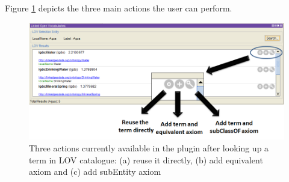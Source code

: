 Figure \ref{fig:LOVoptions} depicts the three main actions the user can perform. %

\begin{figure}[b!ht]
\center
\includegraphics[scale=0.4]{img/LOVOptions.png}
\caption{Three actions currently available in the plugin after looking up a term in LOV catalogue: (a) reuse it directly, (b) add equivalent axiom and (c) add subEntity axiom}
\label{fig:LOVoptions}
\end{figure}


